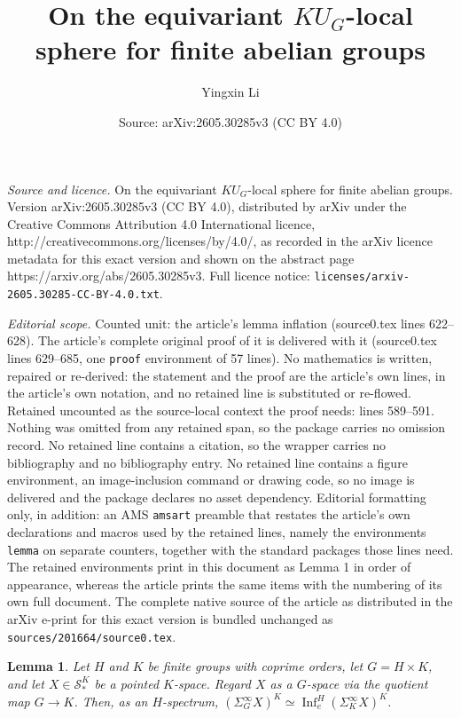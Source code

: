 \documentclass[10pt,a4paper]{amsart}
\title{On the equivariant $KU_G$-local sphere for finite abelian groups}
\author{Yingxin Li}
\date{Source: arXiv:2605.30285v3 (CC BY 4.0)}
\newtheorem{lemma}{Lemma}
\begin{document}
\maketitle

\noindent\emph{Source and licence.} On the equivariant $KU_G$-local sphere for finite abelian groups. Version arXiv:2605.30285v3 (CC BY 4.0), distributed by arXiv under the Creative Commons Attribution 4.0 International licence, http://creativecommons.org/licenses/by/4.0/, as recorded in the arXiv licence metadata for this exact version and shown on the abstract page https://arxiv.org/abs/2605.30285v3. Full licence notice: \texttt{licenses/arxiv-2605.30285-CC-BY-4.0.txt}.\par\smallskip

\noindent\textit{Editorial scope.} Counted unit: the article's lemma inflation (source0.tex lines 622--628). The article's complete original proof of it is delivered with it (source0.tex lines 629--685, one \texttt{proof} environment of 57 lines). No mathematics is written, repaired or re-derived: the statement and the proof are the article's own lines, in the article's own notation, and no retained line is substituted or re-flowed.  Retained uncounted as the source-local context the proof needs: lines 589--591.  Nothing was omitted from any retained span, so the package carries no omission record.  No retained line contains a citation, so the wrapper carries no bibliography and no bibliography entry.  No retained line contains a figure environment, an image-inclusion command or drawing code, so no image is delivered and the package declares no asset dependency.  Editorial formatting only, in addition: an AMS \texttt{amsart} preamble that restates the article's own declarations and macros used by the retained lines, namely the environments \texttt{lemma} on separate counters, together with the standard packages those lines need.  The retained environments print in this document as Lemma 1 in order of appearance, whereas the article prints the same items with the numbering of its own full document.  The complete native source of the article as distributed in the arXiv e-print for this exact version is bundled unchanged as \texttt{sources/201664/source0.tex}.
\begin{lemma}\label{lem:fixed point of suspension spectra}
    Let $H$ and $K$ be finite groups with coprime orders, let $G=H\times K$, and let $X\in \mathcal{S}^K_*$ be a pointed $K$-space. Regard $X$ as a $G$-space via the quotient map $G\to K$. Then, as an $H$-spectrum, $(\Sigma^\infty_G X)^K\simeq \operatorname{Inf}_e^H (\Sigma_K^\infty X)^K$. 
\end{lemma}
\end{document}
